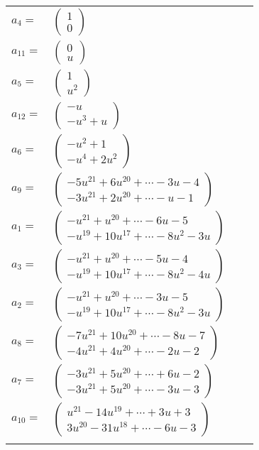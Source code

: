 \documentclass[1p]{elsarticle_modified}
\theoremstyle{definition}
\begin{document}
\begin{tabular}{m{7pt} m{180pt} m{7pt} m{180pt} }
\flushright $a_{4}=$&$\begin{pmatrix}1\\0\end{pmatrix}$ \\
\flushright $a_{11}=$&$\begin{pmatrix}0\\u\end{pmatrix}$ \\
\flushright $a_{5}=$&$\begin{pmatrix}1\\u^2\end{pmatrix}$ \\
\flushright $a_{12}=$&$\begin{pmatrix}- u\\- u^3+u\end{pmatrix}$ \\
\flushright $a_{6}=$&$\begin{pmatrix}- u^2+1\\- u^4+2 u^2\end{pmatrix}$ \\
\flushright $a_{9}=$&$\begin{pmatrix}-5 u^{21}+6 u^{20}+\cdots-3 u-4\\-3 u^{21}+2 u^{20}+\cdots- u-1\end{pmatrix}$ \\
\flushright $a_{1}=$&$\begin{pmatrix}- u^{21}+u^{20}+\cdots-6 u-5\\- u^{19}+10 u^{17}+\cdots-8 u^2-3 u\end{pmatrix}$ \\
\flushright $a_{3}=$&$\begin{pmatrix}- u^{21}+u^{20}+\cdots-5 u-4\\- u^{19}+10 u^{17}+\cdots-8 u^2-4 u\end{pmatrix}$ \\
\flushright $a_{2}=$&$\begin{pmatrix}- u^{21}+u^{20}+\cdots-3 u-5\\- u^{19}+10 u^{17}+\cdots-8 u^2-3 u\end{pmatrix}$ \\
\flushright $a_{8}=$&$\begin{pmatrix}-7 u^{21}+10 u^{20}+\cdots-8 u-7\\-4 u^{21}+4 u^{20}+\cdots-2 u-2\end{pmatrix}$ \\
\flushright $a_{7}=$&$\begin{pmatrix}-3 u^{21}+5 u^{20}+\cdots+6 u-2\\-3 u^{21}+5 u^{20}+\cdots-3 u-3\end{pmatrix}$ \\
\flushright $a_{10}=$&$\begin{pmatrix}u^{21}-14 u^{19}+\cdots+3 u+3\\3 u^{20}-31 u^{18}+\cdots-6 u-3\end{pmatrix}$\\&\end{tabular}
\end{document}

